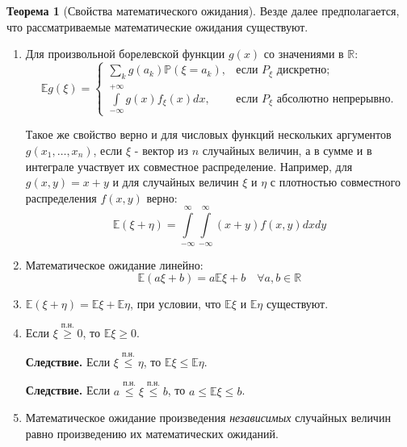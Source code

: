 \documentclass[oneside,final,14pt]{extreport}
\newcommand\mycon{{\bf Следствие.}}
\theoremstyle{plain}
\theoremstyle{definition}
\theoremstyle{named}
\newtheorem*{namedthm}{Теорема}
\begin{document}
\begin{namedthm}[Свойства математического ожидания]
    Везде далее предполагается, что рассматриваемые математические ожидания существуют.
\begin{enumerate}
    \item Для произвольной борелевской функции $g(x)$ со значениями в $\mathbb{R}$:
    \begin{equation*}
    \mathbb{E} g(\xi) =
    \begin{cases}
        \sum\limits_{k} g\left(a_{k}\right) \mathbb{P}\left(\xi=a_{k}\right), & \text {если~} P_{\xi} \text {~дискретно}; \\
        \int\limits_{-\infty}^{+\infty} g(x) f_{\xi}(x) d x, & \text {если~} P_{\xi} \text{~абсолютно непрерывно.}
    \end{cases}
    \end{equation*}

    Такое же свойство верно и для числовых функций нескольких аргументов $g(x_1, \ldots, x_n)$, если $\xi$ - вектор из $n$ случайных величин, а в сумме и в интеграле участвует их совместное распределение. Например, для $g(x,y) = x + y$ и для случайных величин $\xi$ и $\eta$ с плотностью совместного распределения $f(x,y)$ верно: 
    \begin{equation}
        \mathbb{E}(\xi+\eta)=\int\limits_{-\infty}^{\infty} \int\limits_{-\infty}^{\infty}(x+y) f(x, y) d x d y
    \end{equation}
   
    \item Математическое ожидание линейно:
    \begin{equation}
        \mathbb{E}(a \xi + b) = a \mathbb{E}\xi + b \quad \forall a,b \in \mathbb{R}
    \end{equation}
    \item $\mathbb{E}(\xi + \eta) = \mathbb{E}\xi + \mathbb{E}\eta$, при условии, что $\mathbb{E}\xi$ и $\mathbb{E}\eta$ существуют.
    
    \item Если $\xi \overset{\text{п.н.}}{\geqslant} 0$, то $\mathbb{E}\xi \geqslant 0.$
    
    \mycon{} Если $\xi \overset{\text{п.н.}}{\leqslant} \eta$, то $\mathbb{E}\xi \leqslant \mathbb{E}\eta.$
    
    \mycon{} Если $a \overset{\text{п.н.}}{\leqslant} \xi \overset{\text{п.н.}}{\leqslant} b$, то $a \leqslant \mathbb{E}\xi \leqslant b$.
    
    \item Математическое ожидание произведения {\it независимых} случайных величин равно произведению их математических ожиданий.
    

\end{enumerate}
\end{namedthm}
\end{document}
